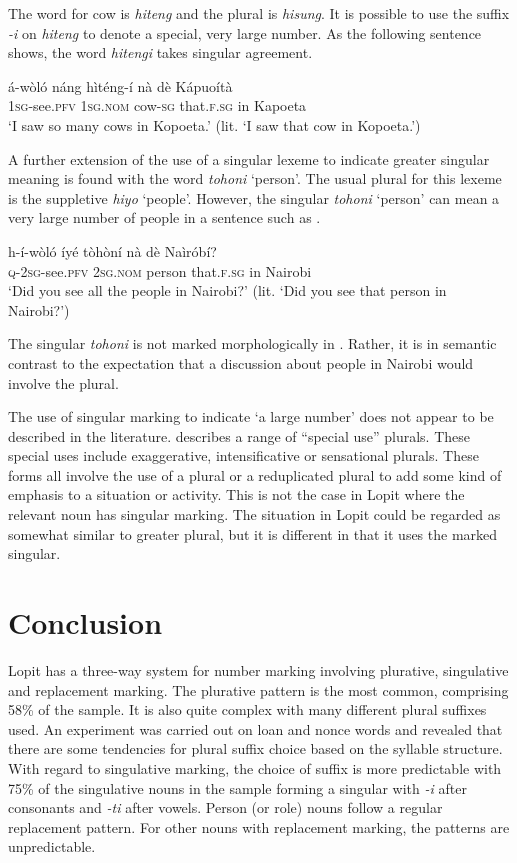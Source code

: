 \documentclass[output=paper]{langsci/langscibook}
\begin{document}
The word for cow is \textit{hiteng} and the plural is \textit{hisung}. It is possible to use the suffix \textit{-i} on \textit{hiteng} to denote a special, very large number. As the following sentence shows, the word \textit{hitengi} takes singular agreement.

\ea\label{ex:moodie:13}
\gll á-wòló náng hìténg-í nà dè Kápuoítà \\
1\textsc{sg}-see.\textsc{pfv} 1\textsc{sg.nom} cow-\textsc{sg} that.\textsc{f.sg} in Kapoeta \\
\glt ‘I saw so many cows in Kopoeta.’ (lit. ‘I saw that cow in Kopoeta.’)
\z

A further extension of the use of a singular lexeme to indicate greater singular meaning is found with the word \textit{tohoni} ‘person’. The usual plural for this lexeme is the suppletive \textit{hiyo} ‘people’. However, the singular \textit{tohoni} ‘person’ can mean a very large number of people in a sentence such as .

\ea\label{ex:moodie:14}
\gll h-í-wòló íyé tòhòní nà dè Naìróbí? \\
\textsc{q-2sg}-see.\textsc{pfv} 2\textsc{sg.nom} person that.\textsc{f.sg} in Nairobi \\
\glt ‘Did you see all the people in Nairobi?’ (lit. ‘Did you see that person in Nairobi?’)
\z

The singular \textit{tohoni} is not marked morphologically in . Rather, it is in semantic contrast to the expectation that a discussion about people in Nairobi would involve the plural.

The use of singular marking to indicate ‘a large number’ does not appear to be described in the literature. \citet[234]{Corbett2000} describes a range of “special use” plurals. These special uses include exaggerative, intensificative or sensational plurals. These forms all involve the use of a plural or a reduplicated plural to add some kind of emphasis to a situation or activity. This is not the case in Lopit where the relevant noun has singular marking. The situation in Lopit could be regarded as somewhat similar to greater plural, but it is different in that it uses the marked singular. 

\section{Conclusion}

Lopit has a three-way system for number marking involving plurative, singulative and replacement marking. The plurative pattern is the most common, comprising 58\% of the sample. It is also quite complex with many different plural suffixes used. An experiment was carried out on loan and nonce words and revealed that there are some tendencies for plural suffix choice based on the syllable structure. With regard to singulative marking, the choice of suffix is more predictable with 75\% of the singulative nouns in the sample forming a singular with \textit{-i} after consonants and \textit{-ti} after vowels. Person (or role) nouns follow a regular replacement pattern. For other nouns with replacement marking, the patterns are unpredictable.
\end{document}
